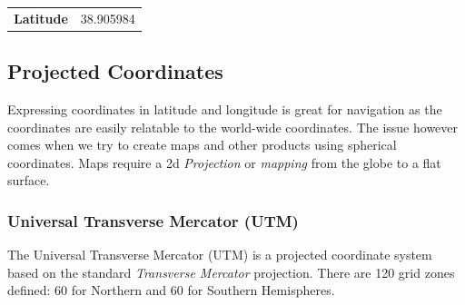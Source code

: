 \begin{table}[h!]
\begin{tabular}{l l}
\textbf{Latitude} & 38.905984
\end{tabular}
\end{table}

\subsection*{Projected Coordinates}

Expressing coordinates in latitude and longitude is great for navigation 
as the coordinates are easily relatable to the world-wide coordinates. 
The issue however comes when we try to create maps and other products using
spherical coordinates.  Maps require a 2d \emph{Projection} or \emph{mapping}
from the globe to a flat surface.  


\subsubsection*{Universal Transverse Mercator (UTM)}

The Universal Transverse Mercator (UTM) is a projected coordinate system based on the
standard \emph{Transverse Mercator} projection.  There are 120 grid zones defined:
60 for Northern and 60 for Southern Hemispheres. 

